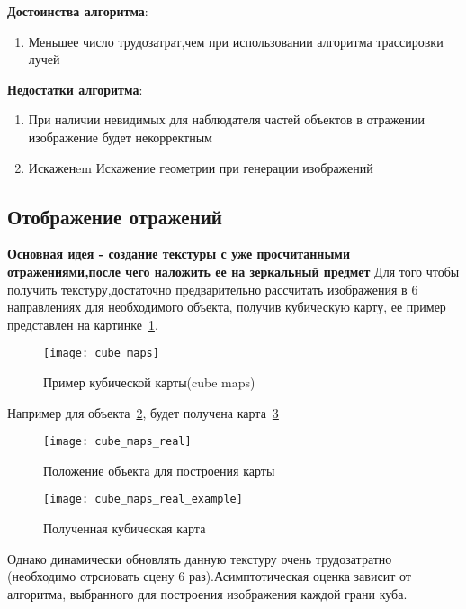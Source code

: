 \textbf{Достоинства алгоритма}:
\begin{enumerate}
	\item Меньшее число трудозатрат,чем при использовании алгоритма трассировки лучей \cite{SSR}
\end{enumerate}

\textbf{Недостатки алгоритма}:
\begin{enumerate}
	\item При наличии невидимых для наблюдателя частей объектов в отражении изображение будет некорректным \cite{SSR}
	\item Искаженem Искажение геометрии при генерации изображений \cite{SSR}
\end{enumerate}

\subsection{Отображение отражений}
\textbf{Основная идея - создание текстуры с уже просчитанными отражениями,после чего наложить ее на зеркальный предмет} \newline
Для того чтобы получить текстуру,достаточно предварительно рассчитать изображения в 6 направлениях для необходимого объекта, получив кубическую карту, ее пример представлен на картинке~\ref{fig:cube_maps}.\cite{reflexion_types}
\begin{figure}[h]
	\centering
	\texttt{[image: cube\_maps]}
	\caption{Пример кубической карты(cube maps)}
	\label{fig:cube_maps}
\end{figure}

Например для объекта~\ref{fig:cube_maps_real}, будет получена карта~\ref{fig:cube_maps_real_example}


\begin{figure}[H]
	\centering
	\texttt{[image: cube\_maps\_real]}
	\caption{Положение объекта для построения карты}
	\label{fig:cube_maps_real}
\end{figure}


\begin{figure}[H]
	\centering
	\texttt{[image: cube\_maps\_real\_example]}
	\caption{Полученная кубическая карта}
	\label{fig:cube_maps_real_example}
\end{figure}


Однако динамически обновлять данную текстуру очень трудозатратно (необходимо отрсиовать сцену 6 раз).Асимптотическая оценка зависит от алгоритма, выбранного для построения изображения каждой грани куба.


